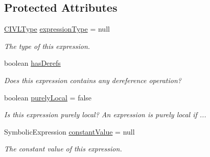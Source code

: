 \subsection*{Protected Attributes}
\begin{DoxyCompactItemize}
\item 
\hypertarget{classedu_1_1udel_1_1cis_1_1vsl_1_1civl_1_1model_1_1common_1_1expression_1_1CommonExpression_a488795a8299d914e1ab5ec101c1c6e66}{}\hyperlink{interfaceedu_1_1udel_1_1cis_1_1vsl_1_1civl_1_1model_1_1IF_1_1type_1_1CIVLType}{C\+I\+V\+L\+Type} \hyperlink{classedu_1_1udel_1_1cis_1_1vsl_1_1civl_1_1model_1_1common_1_1expression_1_1CommonExpression_a488795a8299d914e1ab5ec101c1c6e66}{expression\+Type} = null\label{classedu_1_1udel_1_1cis_1_1vsl_1_1civl_1_1model_1_1common_1_1expression_1_1CommonExpression_a488795a8299d914e1ab5ec101c1c6e66}

\begin{DoxyCompactList}\small\item\em The type of this expression. \end{DoxyCompactList}\item 
\hypertarget{classedu_1_1udel_1_1cis_1_1vsl_1_1civl_1_1model_1_1common_1_1expression_1_1CommonExpression_adfdb22544d6497dd2050ac7fee558b8b}{}boolean \hyperlink{classedu_1_1udel_1_1cis_1_1vsl_1_1civl_1_1model_1_1common_1_1expression_1_1CommonExpression_adfdb22544d6497dd2050ac7fee558b8b}{has\+Derefs}\label{classedu_1_1udel_1_1cis_1_1vsl_1_1civl_1_1model_1_1common_1_1expression_1_1CommonExpression_adfdb22544d6497dd2050ac7fee558b8b}

\begin{DoxyCompactList}\small\item\em Does this expression contains any dereference operation? \end{DoxyCompactList}\item 
\hypertarget{classedu_1_1udel_1_1cis_1_1vsl_1_1civl_1_1model_1_1common_1_1expression_1_1CommonExpression_a1db0f18fd4c15bb72d1fa7b62c4eba72}{}boolean \hyperlink{classedu_1_1udel_1_1cis_1_1vsl_1_1civl_1_1model_1_1common_1_1expression_1_1CommonExpression_a1db0f18fd4c15bb72d1fa7b62c4eba72}{purely\+Local} = false\label{classedu_1_1udel_1_1cis_1_1vsl_1_1civl_1_1model_1_1common_1_1expression_1_1CommonExpression_a1db0f18fd4c15bb72d1fa7b62c4eba72}

\begin{DoxyCompactList}\small\item\em Is this expression purely local? An expression is purely local if ... \end{DoxyCompactList}\item 
Symbolic\+Expression \hyperlink{classedu_1_1udel_1_1cis_1_1vsl_1_1civl_1_1model_1_1common_1_1expression_1_1CommonExpression_a7e87d87775778380f166d4704c0dc269}{constant\+Value} = null
\begin{DoxyCompactList}\small\item\em The constant value of this expression. \end{DoxyCompactList}\end{DoxyCompactItemize}


